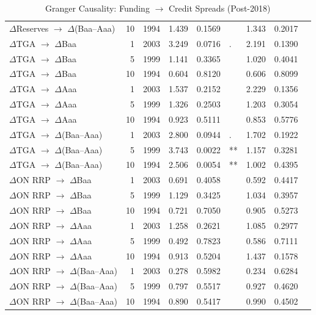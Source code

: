 \begin{table}[H]
{\begin{tabular}{lrrrrlrrl}
  $\Delta$Reserves $\rightarrow$ $\Delta$(Baa--Aaa) & 10 & 1994 & 1.439 & 0.1569 &  & 1.343 & 0.2017 &  \\ 
  $\Delta$TGA $\rightarrow$ $\Delta$Baa & 1 & 2003 & 3.249 & 0.0716 & . & 2.191 & 0.1390 &  \\ 
  $\Delta$TGA $\rightarrow$ $\Delta$Baa & 5 & 1999 & 1.141 & 0.3365 &  & 1.020 & 0.4041 &  \\ 
  $\Delta$TGA $\rightarrow$ $\Delta$Baa & 10 & 1994 & 0.604 & 0.8120 &  & 0.606 & 0.8099 &  \\ 
  $\Delta$TGA $\rightarrow$ $\Delta$Aaa & 1 & 2003 & 1.537 & 0.2152 &  & 2.229 & 0.1356 &  \\ 
  $\Delta$TGA $\rightarrow$ $\Delta$Aaa & 5 & 1999 & 1.326 & 0.2503 &  & 1.203 & 0.3054 &  \\ 
  $\Delta$TGA $\rightarrow$ $\Delta$Aaa & 10 & 1994 & 0.923 & 0.5111 &  & 0.853 & 0.5776 &  \\ 
  $\Delta$TGA $\rightarrow$ $\Delta$(Baa--Aaa) & 1 & 2003 & 2.800 & 0.0944 & . & 1.702 & 0.1922 &  \\ 
  $\Delta$TGA $\rightarrow$ $\Delta$(Baa--Aaa) & 5 & 1999 & 3.743 & 0.0022 & ** & 1.157 & 0.3281 &  \\ 
  $\Delta$TGA $\rightarrow$ $\Delta$(Baa--Aaa) & 10 & 1994 & 2.506 & 0.0054 & ** & 1.002 & 0.4395 &  \\ 
  $\Delta$ON RRP $\rightarrow$ $\Delta$Baa & 1 & 2003 & 0.691 & 0.4058 &  & 0.592 & 0.4417 &  \\ 
  $\Delta$ON RRP $\rightarrow$ $\Delta$Baa & 5 & 1999 & 1.129 & 0.3425 &  & 1.034 & 0.3957 &  \\ 
  $\Delta$ON RRP $\rightarrow$ $\Delta$Baa & 10 & 1994 & 0.721 & 0.7050 &  & 0.905 & 0.5273 &  \\ 
  $\Delta$ON RRP $\rightarrow$ $\Delta$Aaa & 1 & 2003 & 1.258 & 0.2621 &  & 1.085 & 0.2977 &  \\ 
  $\Delta$ON RRP $\rightarrow$ $\Delta$Aaa & 5 & 1999 & 0.492 & 0.7823 &  & 0.586 & 0.7111 &  \\ 
  $\Delta$ON RRP $\rightarrow$ $\Delta$Aaa & 10 & 1994 & 0.913 & 0.5204 &  & 1.437 & 0.1578 &  \\ 
  $\Delta$ON RRP $\rightarrow$ $\Delta$(Baa--Aaa) & 1 & 2003 & 0.278 & 0.5982 &  & 0.234 & 0.6284 &  \\ 
  $\Delta$ON RRP $\rightarrow$ $\Delta$(Baa--Aaa) & 5 & 1999 & 0.797 & 0.5517 &  & 0.927 & 0.4620 &  \\ 
  $\Delta$ON RRP $\rightarrow$ $\Delta$(Baa--Aaa) & 10 & 1994 & 0.890 & 0.5417 &  & 0.990 & 0.4502 &  \\ 
   \bottomrule
\end{tabular}
}
\caption{Granger Causality: Funding $\rightarrow$ Credit Spreads (Post-2018)} 
\label{tab:granger_fwd_post2018}
\end{table}
